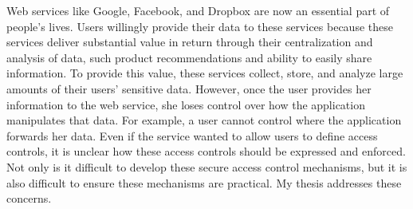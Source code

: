 %
%


\vspace{.3in}

\noindent \abstract

Web services like Google, Facebook, and Dropbox are now an essential part of people’s lives. Users
willingly provide their data to these services because these services deliver substantial value in return
through their centralization and analysis of data, such product recommendations and ability to easily
share information. To provide this value, 
these services collect, store, and analyze large amounts of their users’ sensitive
data. However, once the user provides her information to the web service, she loses control over how the
application manipulates that data. For example, a user cannot control where the application forwards
her data. Even if the service wanted to allow users to define access controls, it is unclear how these access
controls should be expressed and enforced. Not only is it difficult to develop these secure access control
mechanisms, but it is also difficult to ensure these mechanisms are practical. My thesis addresses these
concerns. 

%
%

%
%
